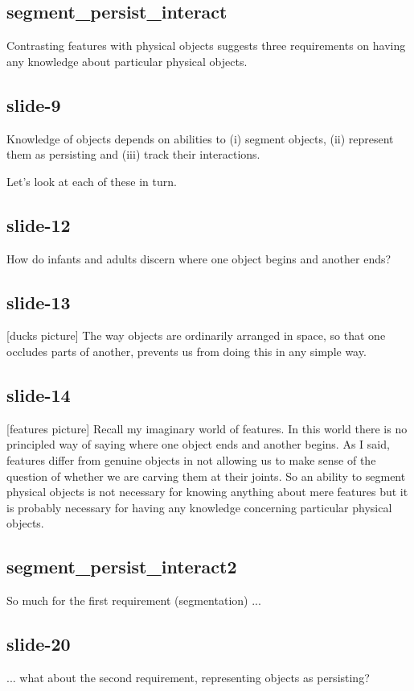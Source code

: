 \documentclass[12pt,\papersize]{extarticle}
\begin{document}
\subsection{segment\_persist\_interact}
Contrasting features with physical objects suggests three requirements on having any 
knowledge about particular physical objects.
 
\subsection{slide-9}
Knowledge of objects depends on abilities to (i) segment objects, (ii) represent them as 
persisting and (iii) track their interactions.
 
Let's look at each of these in turn.
 
\subsection{slide-12}
How do infants and adults discern where one object begins and another ends?
 
\subsection{slide-13}
[ducks picture]
The way objects are ordinarily arranged in space, so that one occludes parts of another, 
prevents us from doing this in any simple way.
 
\subsection{slide-14}
[features picture]
Recall my imaginary world of features.  In this world there is no principled way of saying 
where one object ends and another begins.
As I said, features differ from genuine objects in not allowing us to make sense of the question of 
whether we are carving them at their joints.
So an ability to segment physical objects is not necessary for knowing anything about
mere features but it is probably necessary for having any knowledge 
concerning particular physical objects.
 
\subsection{segment\_persist\_interact2}
So much for the first requirement (segmentation) ...
 
\subsection{slide-20}
... what about the second requirement, representing objects as persisting?
 
\end{document}
